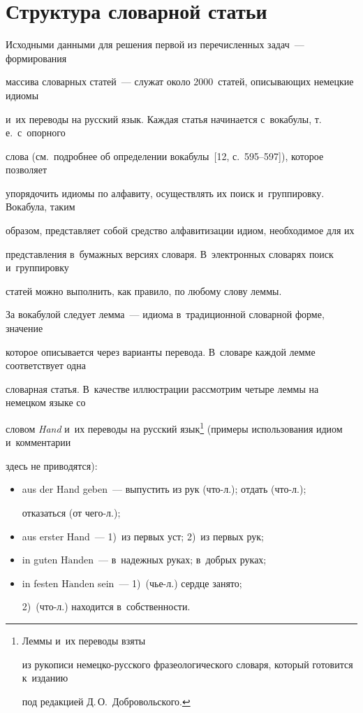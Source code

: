 \section{Структура словарной статьи}







  Исходными данными для решения первой из перечисленных задач~--- формирования 

массива словарных статей~--- служат около 2000~статей, описывающих немецкие идиомы 

и~их переводы на русский язык. Каждая статья начинается с~вокабулы, т.\,е.\ с~опорного 

слова (см.\ подробнее об определении вокабулы~[12, с.~595--597]), которое позволяет 

упорядочить идиомы по алфавиту, осуществлять их поиск и~группировку. Вокабула, таким 

образом, представляет собой средство алфавитизации идиом, необходимое для их 

представления в~бумажных версиях словаря. В~электронных словарях поиск и~группировку 

статей можно выполнить, как правило, по любому слову леммы.



 

  За вокабулой следует лемма~--- идиома в~традиционной словарной форме, значение 

которое описывается через варианты перевода. В~словаре каждой лемме соответствует одна 

словарная статья. В~качестве иллюстрации рассмотрим четыре леммы на немецком языке со 

словом \textit{Hand} и~их переводы на русский язык\footnote{Леммы и~их переводы взяты 

из рукописи немецко-русского фразеологического словаря, который готовится к~изданию 

под редакцией Д.\,О.~Добровольского.} (примеры использования идиом и~комментарии 

здесь не приводятся):

  \begin{itemize}

\item aus der Hand geben~--- выпустить из рук (что-л.); отдать (что-л.);

 отказаться (от чего-л.);

  \item aus erster Hand~--- 1)~из первых уст; 2)~из первых рук;

  \item in guten H$\ddot{\mbox{a}}$nden~--- в~надежных руках; в~добрых руках;

  \item in festen H$\ddot{\mbox{a}}$nden sein~--- 1)~(чье-л.) сердце занято; 

  2)~(что-л.) находится в~собственности.

  \end{itemize}

